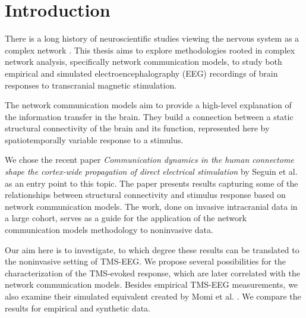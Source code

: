 \chapter*{Introduction}

There is a long history of neuroscientific studies viewing the nervous system as a complex network \cite{sporns_structure_2013}. This thesis aims to explore methodologies rooted in complex network analysis, specifically network communication models, to study both empirical and simulated electroencephalography (EEG) recordings of brain responses to transcranial magnetic stimulation. 

The network communication models aim to provide a high-level explanation of the information transfer in the brain. They build a connection between a static structural connectivity of the brain and its function, represented here by spatiotemporally variable response to a stimulus. 

We chose the recent paper \textit{Communication dynamics in the human connectome shape the cortex-wide propagation of direct electrical stimulation} by Seguin et al. \cite{seguin_communication_2023} as an entry point to this topic. The paper presents results capturing some of the relationships between structural connectivity and stimulus response based on network communication models. The work, done on invasive intracranial data in a large cohort, serves as a guide for the application of the network communication models methodology to noninvasive data. 

Our aim here is to investigate, to which degree these results can be translated to the noninvasive setting of TMS-EEG. We propose several possibilities for the characterization of the TMS-evoked response, which are later correlated with the network communication models. Besides empirical TMS-EEG measurements, we also examine their simulated equivalent created by Momi et al. \cite{momi_tms-evoked_2023}. We compare the results for empirical and synthetic data. 

